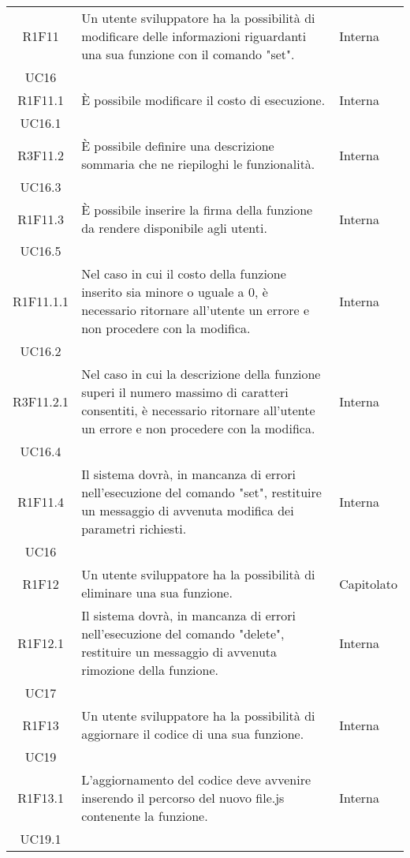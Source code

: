 \begin{longtable}{|c|p{8cm}|C{2cm}|}
	R1F11 &  Un utente sviluppatore ha la possibilità di modificare delle informazioni riguardanti una sua funzione con il comando "set". & \centering Interna \\ UC16 \tabularnewline
	
	R1F11.1 &  È possibile modificare il costo di esecuzione. & \centering Interna \\ UC16.1 \tabularnewline
	
	R3F11.2 &  È possibile definire una descrizione sommaria che ne riepiloghi le funzionalità. & \centering Interna \\ UC16.3 \tabularnewline
	
	R1F11.3 &  È possibile inserire la firma della funzione da rendere disponibile agli utenti. & \centering Interna \\ UC16.5 \tabularnewline
	
	R1F11.1.1 &  Nel caso in cui il costo della funzione inserito sia minore o uguale a 0, è necessario ritornare all'utente un errore e non procedere con la modifica. & \centering Interna \\ UC16.2 \tabularnewline
	
	R3F11.2.1 &  Nel caso in cui la descrizione della funzione superi il numero massimo di caratteri consentiti, è necessario ritornare all'utente un errore e non procedere con la modifica. & \centering Interna \\ UC16.4 \tabularnewline
	
	R1F11.4 &  Il sistema dovrà, in mancanza di errori nell'esecuzione del comando "set", restituire un messaggio di avvenuta modifica dei parametri richiesti. & \centering Interna \\ UC16 \tabularnewline
	
	R1F12 &  Un utente sviluppatore ha la possibilità di eliminare una sua funzione. & Capitolato \\
	
	R1F12.1 & Il sistema dovrà, in mancanza di errori nell'esecuzione del comando "delete", restituire un messaggio di avvenuta rimozione della funzione. & \centering Interna \\ UC17 \tabularnewline
	
	R1F13 &  Un utente sviluppatore ha la possibilità di aggiornare il codice di una sua funzione. & \centering Interna \\ UC19 \tabularnewline
	
	R1F13.1 &  L'aggiornamento del codice deve avvenire inserendo il percorso del nuovo file.js contenente la funzione. & \centering Interna \\ UC19.1 \tabularnewline
	

\end{longtable}
